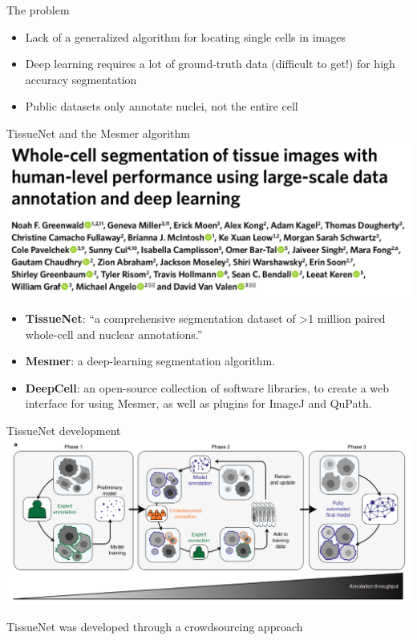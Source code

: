 \documentclass[9pt, aspectratio=169]{beamer}
\begin{document}
\begin{frame}
    {The problem}
    \begin{itemize}
        \item Lack of a generalized algorithm for locating single cells in images
        \item Deep learning requires a lot of ground-truth data (difficult to get!) for high accuracy segmentation
        \item Public datasets only annotate nuclei, not the entire cell
    \end{itemize}
\end{frame}
\begin{frame}
    {TissueNet and the Mesmer algorithm}
    \centering
    \includegraphics[width=\textwidth]{Greenwald2021_title.png}

    \begin{itemize}
        \item \textbf{TissueNet}: ``a comprehensive segmentation dataset of >1 million paired whole-cell and nuclear annotations.''
        \item \textbf{Mesmer}: a deep-learning segmentation algorithm.
        \item \textbf{DeepCell}: an open-source collection of software libraries, to create a web interface for using Mesmer, as well as plugins for ImageJ and QuPath.
    \end{itemize}
\end{frame}

\begin{frame}
    {TissueNet development}
    \centering
    \includegraphics[width=\textwidth]{Greenwald2021_annotation_process.png}

    \footnotesize
    \raggedright
    TissueNet was developed through a crowdsourcing approach
\end{frame}
\end{document}
